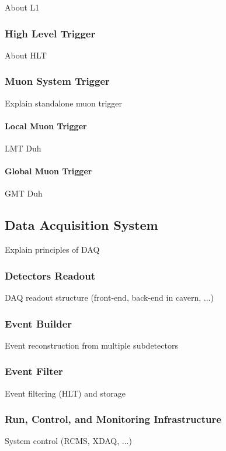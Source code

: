                 About L1

            \subsubsection{High Level Trigger}

                About HLT

            \subsubsection{Muon System Trigger}

                Explain standalone muon trigger

                \paragraph{Local Muon Trigger}

                    LMT Duh

                \paragraph{Global Muon Trigger}

                    GMT Duh

        \subsection{Data Acquisition System}

            Explain principles of DAQ

            \subsubsection{Detectors Readout}

                DAQ readout structure (front-end, back-end in cavern, ...)

            \subsubsection{Event Builder}

                Event reconstruction from multiple subdetectors

            \subsubsection{Event Filter}

                Event filtering (HLT) and storage

            \subsubsection{Run, Control, and Monitoring Infrastructure}

                System control (RCMS, XDAQ, ...)

